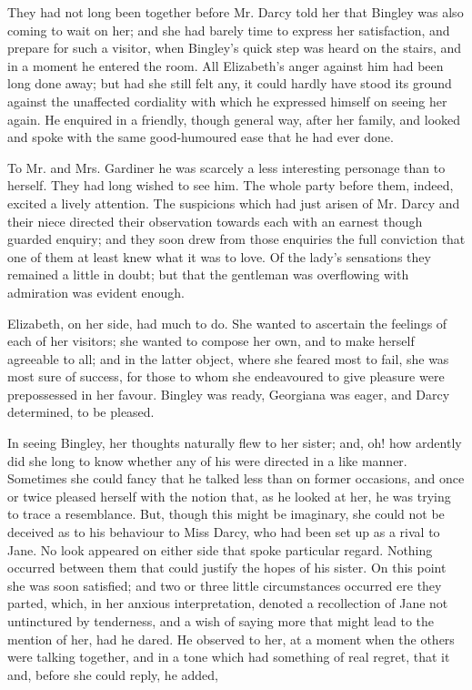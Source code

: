 They had not long been together before Mr. Darcy told her that Bingley was also coming to wait on her; and she had barely time to express her satisfaction, and prepare for such a visitor, when Bingley's quick step was heard on the stairs, and in a moment he entered the room. All Elizabeth's anger against him had been long done away; but had she still felt any, it could hardly have stood its ground against the unaffected cordiality with which he expressed himself on seeing her again. He enquired in a friendly, though general way, after her family, and looked and spoke with the same good-humoured ease that he had ever done.

To Mr. and Mrs. Gardiner he was scarcely a less interesting personage than to herself. They had long wished to see him. The whole party before them, indeed, excited a lively attention. The suspicions which had just arisen of Mr. Darcy and their niece directed their observation towards each with an earnest though guarded enquiry; and they soon drew from those enquiries the full conviction that one of them at least knew what it was to love. Of the lady's sensations they remained a little in doubt; but that the gentleman was overflowing with admiration was evident enough.

Elizabeth, on her side, had much to do. She wanted to ascertain the feelings of each of her visitors; she wanted to compose her own, and to make herself agreeable to all; and in the latter object, where she feared most to fail, she was most sure of success, for those to whom she endeavoured to give pleasure were prepossessed in her favour. Bingley was ready, Georgiana was eager, and Darcy determined, to be pleased.

In seeing Bingley, her thoughts naturally flew to her sister; and, oh! how ardently did she long to know whether any of his were directed in a like manner. Sometimes she could fancy that he talked less than on former occasions, and once or twice pleased herself with the notion that, as he looked at her, he was trying to trace a resemblance. But, though this might be imaginary, she could not be deceived as to his behaviour to Miss Darcy, who had been set up as a rival to Jane. No look appeared on either side that spoke particular regard. Nothing occurred between them that could justify the hopes of his sister. On this point she was soon satisfied; and two or three little circumstances occurred ere they parted, which, in her anxious interpretation, denoted a recollection of Jane not untinctured by tenderness, and a wish of saying more that might lead to the mention of her, had he dared. He observed to her, at a moment when the others were talking together, and in a tone which had something of real regret, that it  and, before she could reply, he added, 

